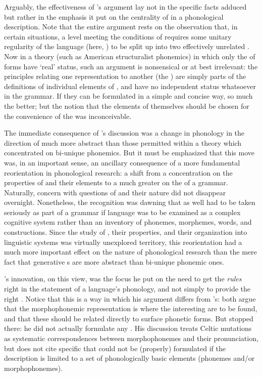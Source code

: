 Arguably, the effectiveness of {\Halle}'s argument lay not in the
specific facts adduced but rather in the emphasis it put on the
centrality of  in a phonological description. Note that the
entire argument rests on the observation that, in certain situations,
a level meeting the conditions of  requires some unitary
regularity of the language (here,  ) to be split up
into two effectively unrelated . Now in a theory (such as
American structuralist phonemics) in which only the  of
forms have `real' status, such an argument is nonsensical or at best
irrelevant: the principles relating one representation to another (the
) are simply parts of the definitions of individual elements of
, and have no independent status whatsoever in the
grammar. If they can be formulated in a simple and concise way, so
much the better; but the notion that the elements of 
themselves should be chosen for the convenience of the  was
inconceivable.
    
\largerpage
The immediate consequence of {\Halle}'s discussion was a change in
phonology in the direction of much more abstract  than
those permitted within a theory which concentrated on bi-unique
phonemics. But it must be emphasized that this move was, in an
important sense, an ancillary consequence of a more fundamental
reorientation in phonological research: a shift from a concentration
on the properties of  and their elements
to a much greater  on the  of a grammar. Naturally, concern
with questions of  and their nature did not disappear
overnight. Nonetheless, the recognition was dawning that  as well
had to be taken seriously as part of a grammar if language was to be
examined as a complex cognitive system rather than an inventory of
phonemes, morphemes, words, and constructions.  Since the study of
, their properties, and their organization into linguistic
systems was virtually unexplored territory, this reorientation had a
much more important effect on the nature of phonological research than
the mere fact that generative s are more
abstract than bi-unique phonemic ones.
  
{\Halle}'s innovation, on this view, was the focus he put on the need to
get the \emph{rules} right in the statement of a language's phonology,
and not simply to provide the right .  Notice that this
is a way in which his argument differs from {\Hamp}'s: both argue that
the morphophonemic representation is where the interesting
 are to be found, and that these should be related
directly to surface phonetic forms. But {\Hamp} stopped there: he did not
actually formulate any . His discussion treats Celtic mutations
as systematic correspondences between morphophonemes and their
pronunciation, but does not cite specific  that could not be
(properly) formulated if the description is limited to a set of
phonologically basic elements (phonemes and/or morphophonemes).
  
